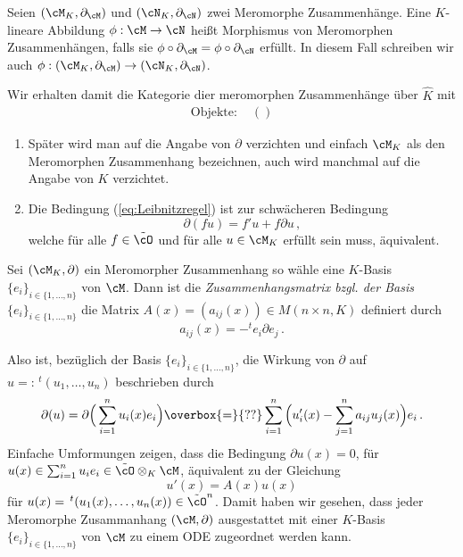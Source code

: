 \begin{defn}
Seien $(\cM_K,\partial_\cM)$ und $(\cN_K,\partial_\cN)$ zwei Meromorphe
Zusammenhänge. Eine $K$-lineare Abbildung $\phi:\cM\rightarrow\cN$ heißt
Morphismus von Meromorphen Zusammenhängen, falls sie
$\phi\circ\partial_\cM=\phi\circ\partial_\cN$ erfüllt. In diesem Fall schreiben
wir auch $\phi:(\cM_K,\partial_\cM)\rightarrow(\cN_K,\partial_\cN)$.
\end{defn}
\begin{comment}
TODO: Wann sind die Isomorph\\
$\cM\cong \cN$ und die Ableitungen kommutieren mit dem Isomorphismus
\end{comment}

\begin{defn}
Wir erhalten damit die Kategorie dier meromorphen Zusammenhänge über $\hat K$
mit 
\begin{align*}
\text{Objekte: } & ()
\end{align*}
\end{defn}

\begin{bem}
\begin{enumerate}
\item Später wird man auf die Angabe von $\partial$ verzichten und einfach
$\cM_K$ als den Meromorphen Zusammenhang bezeichnen, auch wird manchmal auf die
Angabe von $K$ verzichtet.
\item \cite[Rem 5.1.2.]{hotta2007d}
Die Bedingung (\ref{eq:Leibnitzregel}) ist zur schwächeren Bedingung
\[
\partial(fu)=f'u+f\partial u \,,
\]
welche für alle $f\in \tilde\cO$ und für alle $u\in \cM_K$ erfüllt sein muss,
äquivalent.
\end{enumerate}
\end{bem}

\begin{defn}[Zusammenhangsmatrix] \cite[Seite 129]{hotta2007d}
Sei $(\cM_K,\partial)$ ein Meromorpher Zusammenhang so wähle eine $K$-Basis
$\{e_i\}_{i\in\{1,\dots,n\}}$ von $\cM$. Dann ist die
\emph{Zusammenhangsmatrix bzgl. der Basis $\{e_i\}_{i\in\{1,\dots,n\}}$} die
Matrix $A(x)=(a_{ij}(x))\in M(n\times n,K)$ definiert durch
\[ a_{ij}(x) = -^te_i \partial e_j \,. \]
\end{defn}

Also ist, bezüglich der Basis $\{e_i\}_{i\in\{1,\dots,n\}}$, die Wirkung von
$\partial$ auf $u=:\,^t(u_1,\dots,u_n)$ beschrieben durch
\[
\partial(u) = \partial \Big( \sum_{i=1}^nu_i(x)e_i \Big)
\overbox{=}{??}\sum_{i=1}^n \Big( u_i'(x)-
\sum_{j=1}^na_{ij}u_j(x) \Big)e_i \,.
\]
Einfache Umformungen zeigen, dass die Bedingung $\partial u(x)=0$, für
$u(x)\in \sum_{i=1}^n u_ie_i\in \tilde \cO \otimes_K\cM$, äquivalent zu der
Gleichung
\begin{equation*}
u'(x)=A(x)u(x)
\end{equation*}
für $u(x)=\,^t(u_1(x),\dots,u_n(x))\in\tilde \cO^n$. Damit haben wir gesehen,
dass jeder Meromorphe Zusammanhang $(\cM,\partial)$ ausgestattet mit einer
$K$-Basis $\{e_i\}_{i\in\{1,\dots,n\}}$ von $\cM$ zu einem ODE zugeordnet
werden kann.

